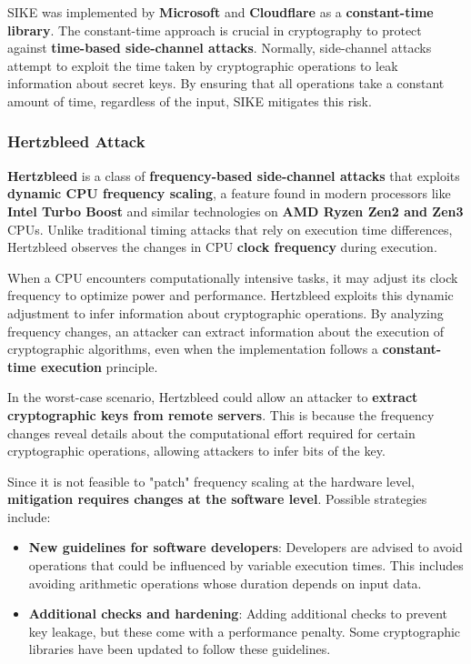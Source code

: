 SIKE was implemented by \textbf{Microsoft} and \textbf{Cloudflare} as
a \textbf{constant-time library}. The constant-time approach is
crucial in cryptography to protect against \textbf{time-based
side-channel attacks}. Normally, side-channel attacks attempt to
exploit the time taken by cryptographic operations to leak information
about secret keys. By ensuring that all operations take a constant
amount of time, regardless of the input, SIKE mitigates this risk.

\subsubsection{Hertzbleed Attack}

\textbf{Hertzbleed} is a class of \textbf{frequency-based
side-channel attacks} that exploits \textbf{dynamic CPU frequency
scaling}, a feature found in modern processors like \textbf{Intel
Turbo Boost} and similar technologies on \textbf{AMD Ryzen Zen2 and
Zen3} CPUs. Unlike traditional timing attacks that rely on execution
time differences, Hertzbleed observes the changes in CPU \textbf{clock
frequency} during execution. 

When a CPU encounters computationally intensive tasks, it may adjust
its clock frequency to optimize power and performance. Hertzbleed
exploits this dynamic adjustment to infer information about
cryptographic operations. By analyzing frequency changes, an attacker
can extract information about the execution of cryptographic
algorithms, even when the implementation follows a
\textbf{constant-time execution} principle.

In the worst-case scenario, Hertzbleed could allow an attacker to
\textbf{extract cryptographic keys from remote servers}. This is
because the frequency changes reveal details about the computational
effort required for certain cryptographic operations, allowing
attackers to infer bits of the key. 

Since it is not feasible to "patch" frequency scaling at the hardware
level, \textbf{mitigation requires changes at the software level}.
Possible strategies include:
\begin{itemize}
    \item \textbf{New guidelines for software developers}: Developers
      are advised to avoid operations that could be influenced by
      variable execution times. This includes avoiding arithmetic
      operations whose duration depends on input data.
    \item \textbf{Additional checks and hardening}: Adding additional
      checks to prevent key leakage, but these come with a performance
      penalty. Some cryptographic libraries have been updated to
      follow these guidelines.
\end{itemize}

